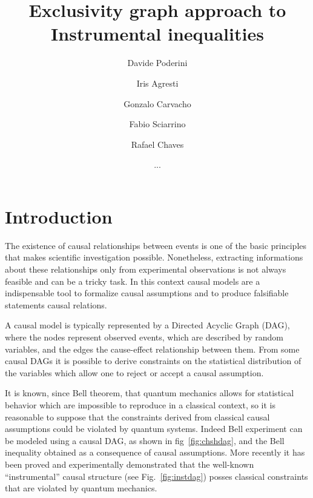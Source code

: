 \documentclass[
    nofootinbin,
    floatfix,
    amsfonts,
    twocolumn, 
    aps, 
    prl]{revtex4-1}
\begin{document}
\title{Exclusivity graph approach to Instrumental inequalities}

\author{Davide Poderini}
\author{Iris Agresti}
\author{Gonzalo Carvacho}
\author{Fabio Sciarrino}

\author{Rafael Chaves}
\author{...}

%    

\maketitle
\section*{Introduction}
The existence of causal relationships between events is one of the basic
principles that makes scientific investigation possible.
Nonetheless, extracting informations about these relationships only from
experimental observations is not always feasible and can be a tricky task.
In this context causal models are a indispensable tool to formalize causal
assumptions and to produce falsifiable statements causal relations. %

A causal model is typically represented by a Directed Acyclic Graph (DAG), where
the nodes represent observed events, which are described by random variables,
and the edges the cause-effect relationship between them.
From some causal DAGs it is possible to derive constraints on the statistical
distribution of the variables which allow one to reject or accept a causal
assumption. %

It is known, since Bell theorem, that quantum mechanics allows for statistical %
behavior which are impossible to reproduce in a classical context, so it is
reasonable to suppose that the constraints derived from classical causal
assumptions could be violated by quantum systems.
Indeed Bell experiment can be modeled using a causal DAG, as shown in
fig~\ref{fig:chshdag}, and the Bell inequality obtained as a consequence of causal
assumptions.
More recently it has been proved and experimentally demonstrated that the
well-known ``instrumental'' causal structure (see Fig.~\ref{fig:instdag})
posses classical constraints that are violated by quantum mechanics. %
\end{document}
